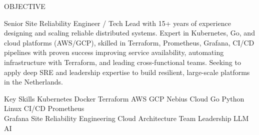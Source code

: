 \documentclass{resume} %
\begin{document}

\begin{rSection}{OBJECTIVE}

{Senior Site Reliability Engineer / Tech Lead with 15+ years of experience designing and scaling reliable distributed systems. 
Expert in Kubernetes, Go, and cloud platforms (AWS/GCP), skilled in Terraform, Prometheus, Grafana, CI/CD pipelines with proven success improving service availability, automating infrastructure with Terraform, and leading cross-functional teams. Seeking to apply deep SRE and leadership expertise to build resilient, large-scale platforms in the Netherlands.}

\end{rSection}

\begin{rSection}{Key Skills}
\center
Kubernetes \textbullet{}
Docker \textbullet{}
Terraform \textbullet{}
AWS \textbullet{}
GCP \textbullet{}
Nebius Cloud \textbullet{}
Go \textbullet{}
Python \textbullet{}
Linux \textbullet{}
CI/CD \textbullet{}
Prometheus \\
Grafana \textbullet{}
Site Reliability Engineering \textbullet{}
Cloud Architecture \textbullet{}
Team Leadership \textbullet{}
LLM \textbullet{}
AI
\end{rSection}
\end{document}
